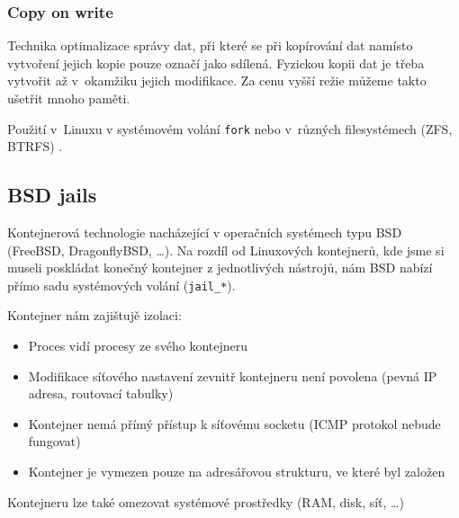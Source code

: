 \subsubsection{Copy on write}

Technika optimalizace správy dat, při které se při kopírování dat namísto vytvoření jejich kopie pouze označí jako sdílená.
Fyzickou kopii dat je třeba vytvořit až v~okamžiku jejich modifikace.
Za cenu vyšší režie můžeme takto ušetřit mnoho paměti.
\cite{copy_on_write}

Použití v~Linuxu v systémovém volání \verb|fork| \cite{fork_manual} nebo v~různých filesystémech (ZFS, BTRFS) \cite{fs_cow}.

\subsection{BSD jails}

Kontejnerová technologie nacházející v operačních systémech typu BSD (FreeBSD, DragonflyBSD, \ldots).
Na rozdíl od Linuxových kontejnerů, kde jsme si museli poskládat konečný kontejner z jednotlivých nástrojů, nám BSD nabízí přímo sadu systémových volání (\verb|jail_*|).

Kontejner nám zajištujě izolaci:
\begin{itemize}
	\item Proces vidí procesy ze svého kontejneru
	\item Modifikace síťového nastavení zevnitř kontejneru není povolena (pevná IP adresa, routovací tabulky)
	\item Kontejner nemá přímý přístup k síťovému socketu (ICMP protokol nebude fungovat)
	\item Kontejner je vymezen pouze na adresářovou strukturu, ve které byl založen
\end{itemize}

Kontejneru lze také omezovat systémové prostředky (RAM, disk, síť, \ldots)


